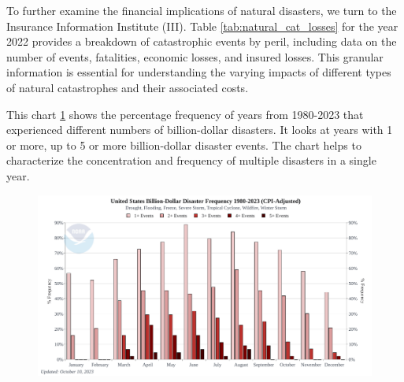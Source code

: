 \documentclass[12pt]{article}
\begin{document}
To further examine the financial implications of natural disasters, we turn to the Insurance Information Institute (III)\cite{iii}. 
Table \ref{tab:natural_cat_losses} for the year 2022 provides a breakdown of catastrophic events by peril, including data on the 
number of events, fatalities, economic losses, and insured losses. This granular information is essential for understanding the 
varying impacts of different types of natural catastrophes and their associated costs.

\begin{table}[h]
    \caption{Natural Catastrophe Losses in the United States by Peril, 2022 (in \$ millions)}
    \label{tab:natural_cat_losses}
    \centering
    \cite{iii}
\end{table}

This chart \ref{fig:disaster_freq} shows the percentage frequency of years from 1980-2023 that experienced different numbers of billion-dollar disasters. It 
looks at years with 1 or more, up to 5 or more billion-dollar disaster events. The chart helps to characterize the concentration and 
frequency of multiple disasters in a single year.

\begin{figure}[ht]
    \centering
    \includegraphics[width=0.8\linewidth]{NCEI US disaster freq.pdf}
    \label{fig:disaster_freq}
    \cite{ncei}
\end{figure}
\end{document}
